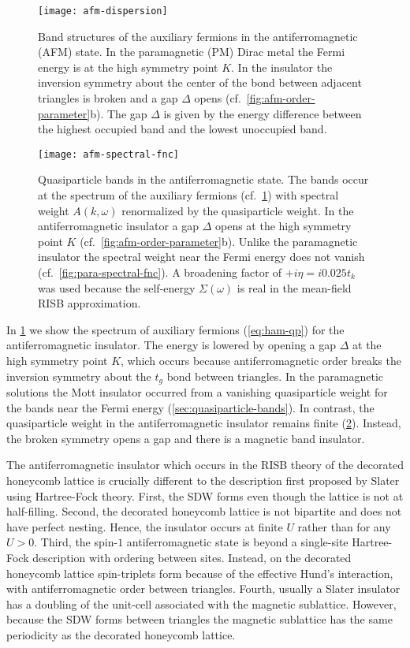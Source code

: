 \documentclass[reprint,aps,prb,amsmath,amssymb]{revtex4-2}
\begin{document}
\begin{figure}
	\centering
	\texttt{[image: afm-dispersion]}
	\caption{\label{fig:afm-dispersion}
		Band structures of the auxiliary fermions in the antiferromagnetic (AFM) state. In the paramagnetic (PM) Dirac metal the Fermi energy is at the high symmetry point $K$. In the insulator the inversion symmetry about the center of the bond between adjacent triangles is broken and a gap $\Delta$ opens (cf.~\cref{fig:afm-order-parameter}b). The gap $\Delta$ is given by the energy difference between the highest occupied band and the lowest unoccupied band.
	}
\end{figure}

\begin{figure}
	\centering
	\texttt{[image: afm-spectral-fnc]}
	\caption{\label{fig:afm-spectral-fnc}
		Quasiparticle bands in the antiferromagnetic state. The bands occur at the spectrum of the auxiliary fermions (cf.~\cref{fig:afm-dispersion}) with spectral weight $A(k,\omega)$ renormalized by the quasiparticle weight. In the antiferromagnetic insulator a gap $\Delta$ opens at the high symmetry point $K$ (cf.~\cref{fig:afm-order-parameter}b). Unlike the paramagnetic insulator the spectral weight near the Fermi energy does not vanish (cf.~\cref{fig:para-spectral-fnc}). A broadening factor of $+i\eta = i0.025t_k$ was used because the self-energy $\Sigma(\omega)$ is real in the mean-field RISB approximation.
	}
\end{figure}

In \cref{fig:afm-dispersion} we show the spectrum of auxiliary fermions (\cref{eq:ham-qp}) for the antiferromagnetic insulator. The energy is lowered by opening a gap $\Delta$ at the high symmetry point $K$, which occurs because antiferromagnetic order breaks the inversion symmetry about the $t_g$ bond between triangles. In the paramagnetic solutions the Mott insulator occurred from a vanishing quasiparticle weight for the bands near the Fermi energy (\cref{sec:quasiparticle-bands}). In contrast, the quasiparticle weight in the antiferromagnetic insulator remains finite (\cref{fig:afm-spectral-fnc}). Instead, the broken symmetry opens a gap and there is a magnetic band insulator.

The antiferromagnetic insulator which occurs in the RISB theory of the decorated honeycomb lattice is crucially different to the description first proposed by Slater using Hartree-Fock theory. First, the SDW forms even though the lattice is not at half-filling. Second, the decorated honeycomb lattice is not bipartite and does not have perfect nesting. Hence, the insulator occurs at finite $U$ rather than for any $U>0$. Third, the spin-$1$ antiferromagnetic state is beyond a single-site Hartree-Fock description with ordering between sites. Instead, on the decorated honeycomb lattice spin-triplets form because of the effective Hund's interaction, with antiferromagnetic order between triangles. Fourth, usually a Slater insulator has a doubling of the unit-cell associated with the magnetic sublattice. However, because the SDW forms between triangles the magnetic sublattice has the same periodicity as the decorated honeycomb lattice.
\end{document}
